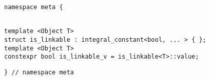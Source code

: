 
\begin{verbatim}
namespace meta {
\end{verbatim}
\begin{verbatim}

template <Object T>
struct is_linkable : integral_constant<bool, ... > { };
template <Object T>
constexpr bool is_linkable_v = is_linkable<T>::value;

\end{verbatim}
\begin{verbatim}
} // namespace meta
\end{verbatim}
